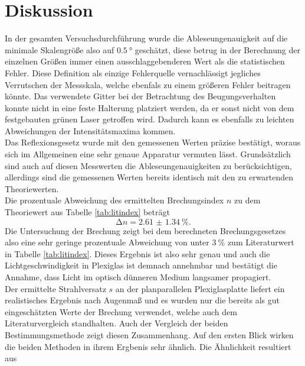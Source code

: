 \section{Diskussion}

In der gesamten Versuchsdurchführung wurde die Ableseungenauigkeit auf die minimale Skalengröße also auf $\SI{0.5}{\degree}$ geschätzt, diese betrug in der
Berechnung der einzelnen Größen immer einen ausschlaggebenderen Wert als die statistischen Fehler. Diese Definition als einzige Fehlerquelle vernachlässigt jegliches Verrutschen der Messskala, welche ebenfals zu einem
größeren Fehler beitragen könnte. Das verwendete Gitter bei der Betrachtung des Beugungsverhalten konnte nicht in eine feste Halterung platziert werden, da er sonst nicht von dem festgebauten grünen Laser getroffen wird. Dadurch
kann es ebenfalls zu leichten Abweichungen der Intensitätsmaxima kommen.
\newline
\\
Das Reflexionsgesetz wurde mit den gemessenen Werten präzise bestätigt, woraus sich im Allgemeinen eine sehr genaue Apparatur vermuten lässt. Grundsätzlich sind auch auf diesen Messwerten die Ableseungenauigkeiten zu berücksichtigen, allerdings
sind die gemessenen Werten bereits identisch mit den zu erwartenden Theoriewerten.
\newline
\\
Die prozentuale Abweichung des ermittelten Brechungsindex $n$ zu dem Theoriewert aus Tabelle \ref{tab:litindex} beträgt
\begin{equation}
    \label{eqn:prozn}
\increment n = \SI{2.61(134)}{\percent}.
\end{equation}
Die Untersuchung der Brechung zeigt bei dem berechneten Brechungsgesetzes also eine sehr geringe prozentuale Abweichung von unter $\SI{3}{\percent}$ zum Literaturwert in Tabelle \ref{tab:litindex}. Dieses Ergebnis ist also sehr genau und auch
die Lichtgeschwindigkeit in Plexiglas ist demnach annehmbar und bestätigt die Annahme, dass Licht im optisch dünneren Medium langsamer propagiert.
\newline
\\
Der ermittelte Strahlversatz $s$ an der planparallelen Plexiglasplatte liefert ein realistisches Ergebnis nach Augenmaß und es wurden nur die bereits als gut eingeschätzten Werte der Brechung verwendet, welche auch dem
Literaturvergleich standhalten. Auch der Vergleich der beiden Bestimmungsmethode zeigt diesen Zusammenhang. Auf den ersten Blick wirken die beiden Methoden in ihrem Ergbenis sehr ähnlich. Die Ähnlichkeit resultiert aus 
